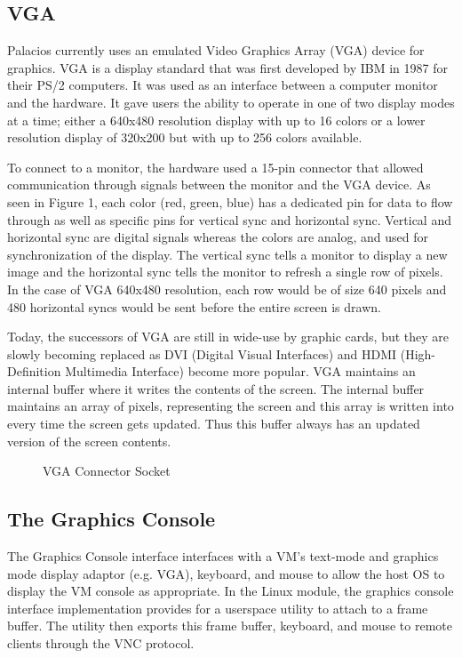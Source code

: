\documentclass{acm_proc_article-sp}
\begin{document}
\subsection{VGA}
Palacios currently uses an emulated Video Graphics Array (VGA) device for graphics. VGA is a display standard that was first developed by IBM in 1987 for their PS/2 computers. It was used as an interface between a computer monitor and the hardware. It gave users the ability to operate in one of two display modes at a time; either a 640x480  resolution display with up to 16 colors or a lower resolution display of 320x200 but with up to 256 colors available. 
\par
To connect to a monitor, the hardware used a 15-pin connector that allowed communication through signals between the monitor and the VGA device. As seen in Figure 1, each color (red, green, blue) has a dedicated pin for data to flow through as well as specific pins for vertical sync and horizontal sync. Vertical and horizontal sync are digital signals whereas the colors are analog, and used for synchronization of the display. The vertical sync tells a monitor to display a new image and the horizontal sync tells the monitor to refresh a single row of pixels. In the case of VGA 640x480 resolution, each row would be of size 640 pixels and 480 horizontal syncs would be sent before the entire screen is drawn. 
\par
Today, the successors of VGA are still in wide-use by graphic cards, but they are slowly becoming replaced as DVI (Digital Visual Interfaces) and HDMI (High-Definition Multimedia Interface) become more popular. VGA maintains an internal buffer where it writes the contents of the screen. The internal buffer maintains an array of pixels, representing the screen and this array is written into every time the screen gets updated. Thus this buffer always has an updated version of the screen contents.

\begin{figure}                                              
\centering                                                     
{}                   
\caption{VGA Connector Socket}   
\end{figure} 

\subsection{The Graphics Console} %
The Graphics Console interface interfaces with a VM's text\--mode and graphics
mode display adaptor (e.g. VGA), keyboard, and mouse to allow the host OS to display the VM
console as appropriate. In the Linux module, the graphics console interface implementation provides
for a userspace utility to attach to a frame buffer. The utility then exports this frame buffer, keyboard,
and mouse to remote clients through the VNC protocol. \cite{Dinda: Technical}
\end{document}
